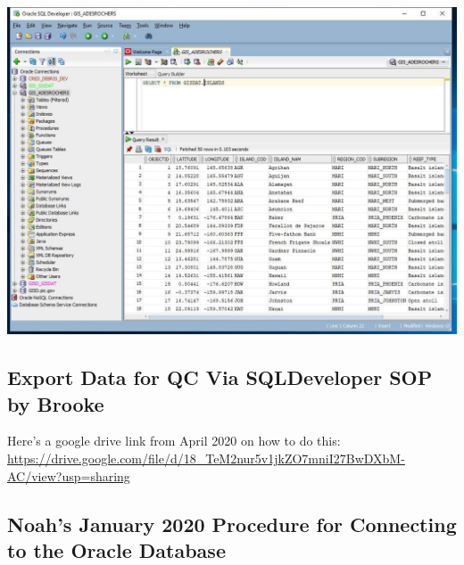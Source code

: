 \documentclass[
]{book}
\begin{document}
\includegraphics{images/SQLDeveloper_Connect_April_2020_2.jpg}

\hypertarget{export-data-for-qc-via-sqldeveloper-sop-by-brooke}{%
\subsection{Export Data for QC Via SQLDeveloper SOP by Brooke}\label{export-data-for-qc-via-sqldeveloper-sop-by-brooke}}

Here's a google drive link from April 2020 on how to do this:
\url{https://drive.google.com/file/d/18_TeM2nur5v1jkZO7mniI27BwDXbM-AC/view?usp=sharing}

\hypertarget{noahs-january-2020-procedure-for-connecting-to-the-oracle-database}{%
\subsection{Noah's January 2020 Procedure for Connecting to the Oracle Database}\label{noahs-january-2020-procedure-for-connecting-to-the-oracle-database}}
\end{document}
